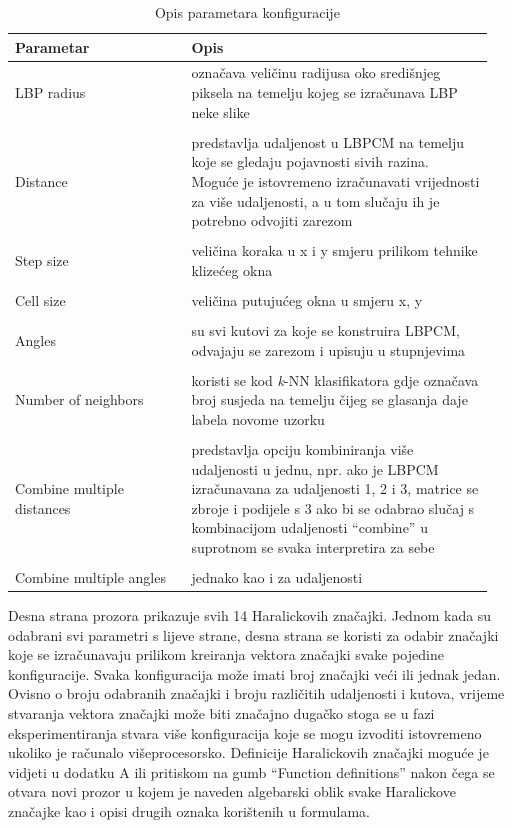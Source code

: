 \documentclass[times, utf8, zavrsni, numeric]{fer}
\begin{document}
\begin{table}
\begin{tabular}{p{0.35\linewidth} | p{0.6\linewidth}}
Parametar & Opis \\
\hline
LBP radius & označava veličinu radijusa oko središnjeg piksela
na temelju kojeg se izračunava LBP neke slike \\

\\
\hline
Distance & predstavlja udaljenost u LBPCM na temelju koje 
se gledaju pojavnosti sivih razina. Moguće je istovremeno izračunavati vrijednosti
za više udaljenosti, a u tom slučaju ih je potrebno odvojiti zarezom \\

\\
\hline
Step size & veličina koraka u x i y smjeru prilikom tehnike klizećeg okna \\

\\
\hline
Cell size & veličina putujućeg okna u smjeru x, y \\

\\
\hline
Angles & su svi kutovi za koje se konstruira LBPCM, odvajaju
se zarezom i upisuju u stupnjevima \\

\\
\hline
Number of neighbors & koristi se kod \textit{k}-NN klasifikatora
gdje označava broj susjeda na temelju čijeg se glasanja daje labela novome uzorku \\

\\
\hline
Combine multiple distances & predstavlja opciju kombiniranja više
udaljenosti u jednu, npr. ako je LBPCM izračunavana za udaljenosti 1, 2 i 3, matrice
se zbroje i podijele s 3 ako bi se odabrao slučaj s kombinacijom udaljenosti \enquote{combine}
u suprotnom se svaka interpretira za sebe \\

\\
\hline
Combine multiple angles & jednako kao i za udaljenosti

\end{tabular}
\caption{Opis parametara konfiguracije}
\end{table}

\bigbreak

Desna strana prozora prikazuje svih 14 Haralickovih značajki. Jednom kada 
su odabrani svi parametri s lijeve strane, desna strana se koristi za odabir 
značajki koje se izračunavaju prilikom kreiranja vektora značajki svake pojedine
konfiguracije. Svaka konfiguracija može imati broj značajki veći ili jednak jedan. 
Ovisno o broju odabranih značajki i broju različitih udaljenosti i kutova, vrijeme
stvaranja vektora značajki može biti značajno dugačko stoga se u fazi eksperimentiranja
stvara više konfiguracija koje se mogu izvoditi istovremeno ukoliko je računalo
višeprocesorsko. Definicije Haralickovih značajki moguće je vidjeti u dodatku A
ili pritiskom na gumb \enquote{Function definitions} nakon čega se otvara novi
prozor u kojem je naveden algebarski oblik svake Haralickove značajke kao i 
opisi drugih oznaka korištenih u formulama. 
\end{document}
